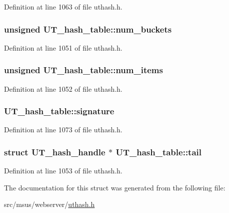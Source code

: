 Definition at line 1063 of file uthash.\-h.

\hypertarget{struct_u_t__hash__table_a3ed04b6233facaedf910672578d86339}{
\subsubsection[{num\-\_\-buckets}]{\setlength{\rightskip}{0pt plus 5cm}unsigned U\-T\-\_\-hash\-\_\-table\-::num\-\_\-buckets}}\label{struct_u_t__hash__table_a3ed04b6233facaedf910672578d86339}


Definition at line 1051 of file uthash.\-h.

\hypertarget{struct_u_t__hash__table_a74534cc14f080c96f94d8f5da83d9d76}{
\subsubsection[{num\-\_\-items}]{\setlength{\rightskip}{0pt plus 5cm}unsigned U\-T\-\_\-hash\-\_\-table\-::num\-\_\-items}}\label{struct_u_t__hash__table_a74534cc14f080c96f94d8f5da83d9d76}


Definition at line 1052 of file uthash.\-h.

\hypertarget{struct_u_t__hash__table_a87d1ab3f3ede1809c6a485972d20b25f}{
\subsubsection[{signature}]{ U\-T\-\_\-hash\-\_\-table\-::signature}}\label{struct_u_t__hash__table_a87d1ab3f3ede1809c6a485972d20b25f}


Definition at line 1073 of file uthash.\-h.

\hypertarget{struct_u_t__hash__table_a00c43ffe6c1545c3f1729acbd7b0ef83}{
\subsubsection[{tail}]{\setlength{\rightskip}{0pt plus 5cm}struct {\bf U\-T\-\_\-hash\-\_\-handle} $\ast$ U\-T\-\_\-hash\-\_\-table\-::tail}}\label{struct_u_t__hash__table_a00c43ffe6c1545c3f1729acbd7b0ef83}


Definition at line 1053 of file uthash.\-h.



The documentation for this struct was generated from the following file\-:\begin{DoxyCompactItemize}
\item 
src/msus/webserver/\hyperlink{msus_2webserver_2uthash_8h}{uthash.\-h}\end{DoxyCompactItemize}
